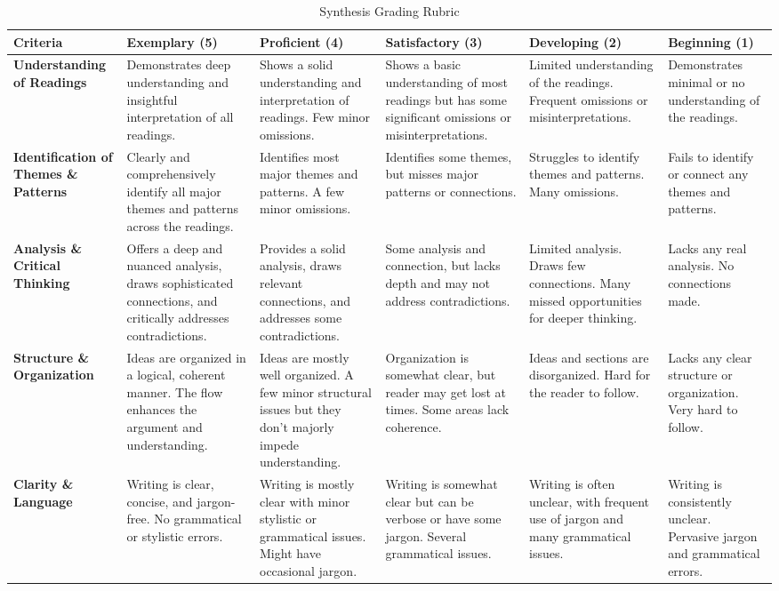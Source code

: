 \documentclass[12pt, letterpaper]{article}
\begin{document}





\appendix

\begin{table}[ht]
    \footnotesize
    \centering
    \caption{Synthesis Grading Rubric}
    \begin{tabularx}{\textwidth}{|X|X|X|X|X|X|}
    \toprule
    \textbf{Criteria} & \textbf{Exemplary (5)} & \textbf{Proficient (4)} & \textbf{Satisfactory (3)} & \textbf{Developing (2)} & \textbf{Beginning (1)} \\
    \midrule
    \textbf{Understanding of Readings} & Demonstrates deep understanding and insightful interpretation of all readings. & Shows a solid understanding and interpretation of readings. Few minor omissions. & Shows a basic understanding of most readings but has some significant omissions or misinterpretations. & Limited understanding of the readings. Frequent omissions or misinterpretations. & Demonstrates minimal or no understanding of the readings. \\
    \midrule
    \textbf{Identification of Themes \& Patterns} & Clearly and comprehensively identify all major themes and patterns across the readings. & Identifies most major themes and patterns. A few minor omissions. & Identifies some themes, but misses major patterns or connections. & Struggles to identify themes and patterns. Many omissions. & Fails to identify or connect any themes and patterns. \\
    \midrule
    \textbf{Analysis \& Critical Thinking} & Offers a deep and nuanced analysis, draws sophisticated connections, and critically addresses contradictions. & Provides a solid analysis, draws relevant connections, and addresses some contradictions. & Some analysis and connection, but lacks depth and may not address contradictions. & Limited analysis. Draws few connections. Many missed opportunities for deeper thinking. & Lacks any real analysis. No connections made. \\
    \midrule
    \textbf{Structure \& Organization} & Ideas are organized in a logical, coherent manner. The flow enhances the argument and understanding. & Ideas are mostly well organized. A few minor structural issues but they don't majorly impede understanding. & Organization is somewhat clear, but reader may get lost at times. Some areas lack coherence. & Ideas and sections are disorganized. Hard for the reader to follow. & Lacks any clear structure or organization. Very hard to follow. \\
    \midrule
    \textbf{Clarity \& Language} & Writing is clear, concise, and jargon-free. No grammatical or stylistic errors. & Writing is mostly clear with minor stylistic or grammatical issues. Might have occasional jargon. & Writing is somewhat clear but can be verbose or have some jargon. Several grammatical issues. & Writing is often unclear, with frequent use of jargon and many grammatical issues. & Writing is consistently unclear. Pervasive jargon and grammatical errors. \\
    \bottomrule
    \end{tabularx}
    \label{tab:synthesis-rubric}
    \end{table}
\end{document}

